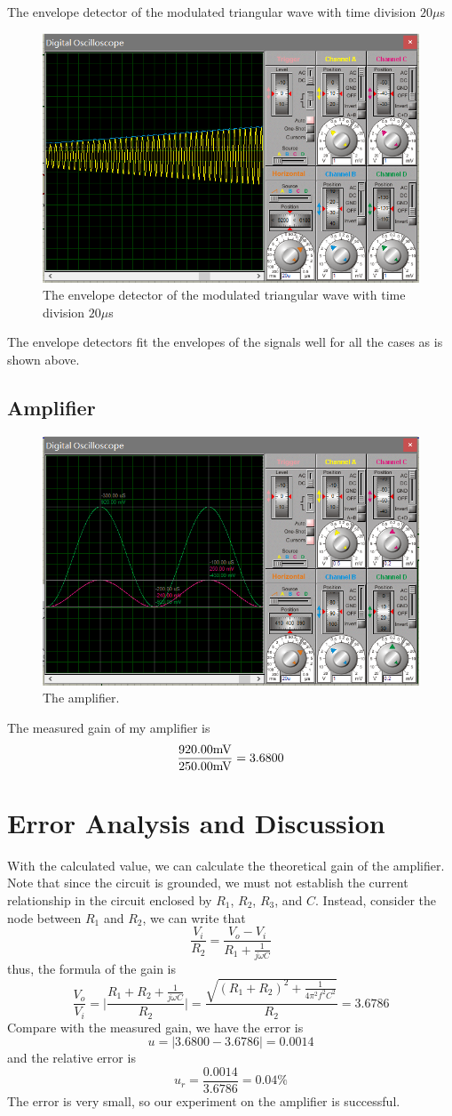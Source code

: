 \documentclass[a4paper]{article}
\begin{document}
The envelope detector of the modulated triangular wave with time division $20\mu$s
\begin{figure}[H]
	\centering
	\includegraphics[width=0.8\linewidth]{23.png}
	\caption{The envelope detector of the modulated triangular wave with time division $20\mu$s}
\end{figure}
The envelope detectors fit the envelopes of the signals well for all the cases as is shown above.
\subsection{Amplifier}
\begin{figure}[H]
	\centering
	\includegraphics[width=0.8\linewidth]{24.png}
	\caption{The amplifier.}
\end{figure}
The measured gain of my amplifier is
$$\frac{920.00\rm{mV}}{250.00\rm{mV}}=3.6800$$
\section{Error Analysis and Discussion}
With the calculated value, we can calculate the theoretical gain of the amplifier. Note that since the circuit is grounded, we must not establish the current relationship in the circuit enclosed by $R_1$, $R_2$, $R_3$, and $C$. Instead, consider the node between $R_1$ and $R_2$, we can write that
$$\frac{V_i}{R_2}=\frac{V_o-V_i}{R_1+\frac{1}{j\omega C}}$$
thus, the formula of the gain is
$$\frac{V_o}{V_i}=\bigg|\frac{R_1+R_2+\frac{1}{j\omega C}}{R_2}\bigg|=\frac{\sqrt{(R_1+R_2)^2+\frac{1}{4\pi^2f^2C^2}}}{R_2}=3.6786$$
Compare with the measured gain, we have the error is
$$u=|3.6800-3.6786|=0.0014$$
and the relative error is
$$u_r=\frac{0.0014}{3.6786}=0.04\%$$
The error is very small, so our experiment on the amplifier is successful.
\end{document}
